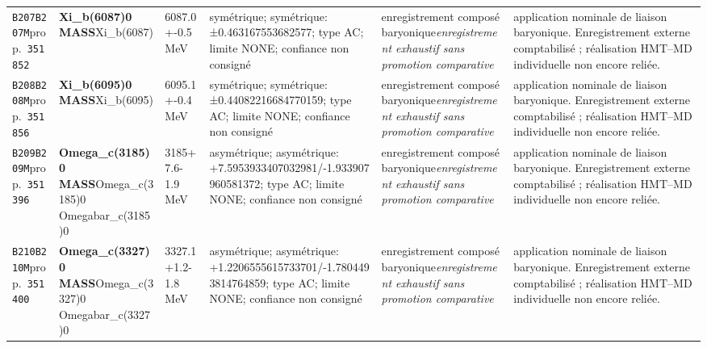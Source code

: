 \begin{landscape}
\begin{longtable}{L{1.85cm}L{4.45cm}L{2.35cm}L{4.05cm}L{3.35cm}L{7.15cm}}
\texttt{B207}\newline \texttt{B207M}\newline prop.\ \texttt{351852} & \textbf{Xi\_\allowbreak{}b(6087)0 MASS}\newline Xi\_\allowbreak{}b(6087) & 6087.0+-0.5\,MeV & symétrique; symétrique: ±0.463167553682577; type AC; limite NONE; confiance non consigné & enregistrement composé baryonique\newline \emph{enregistrement exhaustif sans promotion comparative} & application nominale de liaison baryonique. Enregistrement externe comptabilisé ; réalisation HMT--MD individuelle non encore reliée. \\
\texttt{B208}\newline \texttt{B208M}\newline prop.\ \texttt{351856} & \textbf{Xi\_\allowbreak{}b(6095)0 MASS}\newline Xi\_\allowbreak{}b(6095) & 6095.1+-0.4\,MeV & symétrique; symétrique: ±0.44082216684770159; type AC; limite NONE; confiance non consigné & enregistrement composé baryonique\newline \emph{enregistrement exhaustif sans promotion comparative} & application nominale de liaison baryonique. Enregistrement externe comptabilisé ; réalisation HMT--MD individuelle non encore reliée. \\
\texttt{B209}\newline \texttt{B209M}\newline prop.\ \texttt{351396} & \textbf{Omega\_\allowbreak{}c(3185)0 MASS}\newline Omega\_\allowbreak{}c(3185)0 \textbar{}\allowbreak{} Omegabar\_\allowbreak{}c(3185)0 & 3185+7.6-1.9\,MeV & asymétrique; asymétrique: +7.5953933407032981/-1.933907960581372; type AC; limite NONE; confiance non consigné & enregistrement composé baryonique\newline \emph{enregistrement exhaustif sans promotion comparative} & application nominale de liaison baryonique. Enregistrement externe comptabilisé ; réalisation HMT--MD individuelle non encore reliée. \\
\texttt{B210}\newline \texttt{B210M}\newline prop.\ \texttt{351400} & \textbf{Omega\_\allowbreak{}c(3327)0 MASS}\newline Omega\_\allowbreak{}c(3327)0 \textbar{}\allowbreak{} Omegabar\_\allowbreak{}c(3327)0 & 3327.1+1.2-1.8\,MeV & asymétrique; asymétrique: +1.2206555615733701/-1.7804493814764859; type AC; limite NONE; confiance non consigné & enregistrement composé baryonique\newline \emph{enregistrement exhaustif sans promotion comparative} & application nominale de liaison baryonique. Enregistrement externe comptabilisé ; réalisation HMT--MD individuelle non encore reliée. \\

\end{longtable}
\end{landscape}
